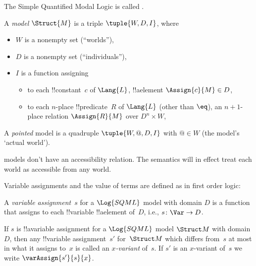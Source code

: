 \documentclass[../../../../include/open-logic-section]{subfiles}
\begin{document}


The Simple Quantified Modal Logic is called .

\begin{defn}
    A  \emph{model} $\Struct {M}$ is a triple
    $\tuple{W, D, I}$, where
    \begin{itemize}
    \item $W$ is a nonempty set (``worlds''),
    \item $D$ is a nonempty set (``individuals''),
    \item $I$ is a function assigning
    \begin{itemize}
        \item to each !!{constant}~$c$ of $\Lang{L}$, !!a{element}
        $\Assign{c}{M}\in D$,
        \item to each $n$-place !!{predicate}~$R$ of $\Lang{L}$ 
        (other than $\eq$), an $n+1$-place relation $\Assign{R}{M}$ over 
        $D^n\times W$,
    \end{itemize}
    \end{itemize}
    A \emph{pointed}  model is a quadruple $\tuple{W, @, D, I}$
    with $@\in W$ (the model's `actual world').
\end{defn}

 models don't have an accessibility relation. The semantics
will in effect treat each world as accessible from any world. 

Variable assignments and the value of terms are defined as in first
order logic:

\begin{defn}
    A \emph{variable assignment}~$s$ for a $\Log{SQML}$ model with
    domain $D$ is a function that assigns to each !!{variable}
    !!a{element} of~$D$, i.e., $s\colon \Var \to D$.
\end{defn}


\begin{defn}[$x$-Variant]
    If $s$ is !!a{variable} assignment for a $\Log{SQML}$ model $\Struct M$ with 
    domain $D$, then any
    !!{variable} assignment~$s'$ for~$\Struct M$ which differs from~$s$ at most
    in what it assigns to~$x$ is called an \emph{$x$-variant} of~$s$.  If
    $s'$ is an $x$-variant of~$s$ we write $\varAssign{s'}{s}{x}$.
\end{defn}
\end{document}
